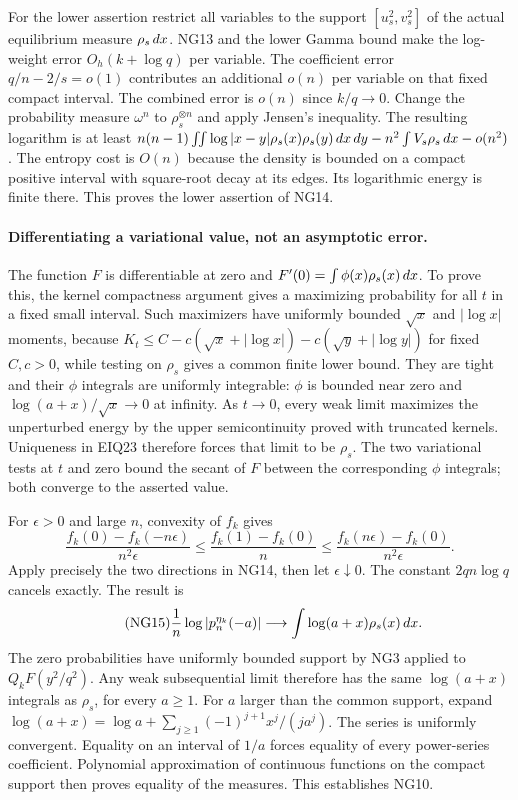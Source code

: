 For the lower assertion restrict all variables to the support
$[u_s^2,v_s^2]$ of the actual equilibrium measure $\rho_s\,d x$.
NG13 and the lower Gamma bound make the log-weight error $O_h(k+\log q)$
per variable. The coefficient error $q/n-2/s=o(1)$ contributes an
additional $o(n)$ per variable on that fixed compact interval. The
combined error is $o(n)$ since $k/q\to0$.
Change the probability measure $\omega^n$ to $\rho_s^{\otimes n}$
and apply Jensen's inequality. The resulting logarithm is at least
$n(n-1)\iint\log|x-y|\rho_s(x)\rho_s(y)\,d x\,d y
-n^2\int V_s\rho_s\,d x-o(n^2)$.
The entropy cost is $O(n)$ because the density is bounded on a compact
positive interval with square-root decay at its edges. Its logarithmic
energy is finite there. This proves the lower assertion of NG14.

\paragraph{Differentiating a variational value, not an asymptotic error.}
The function $F$ is differentiable at zero and
$F'(0)=\int\phi(x)\rho_s(x)\,d x$.
To prove this, the kernel compactness argument gives a maximizing
probability for all $t$ in a fixed small interval. Such maximizers have
uniformly bounded $\sqrt x$ and $|\log x|$ moments, because
$K_t\le C-c(\sqrt x+|\log x|)-c(\sqrt y+|\log y|)$ for fixed
$C,c>0$, while testing on $\rho_s$ gives a common finite lower bound.
They are tight and their $\phi$ integrals are uniformly integrable:
$\phi$ is bounded near zero and $\log(a+x)/\sqrt x\to0$ at infinity.
As $t\to0$, every weak limit maximizes the unperturbed energy by the
upper semicontinuity proved with truncated kernels. Uniqueness in EIQ23
therefore forces that limit to be $\rho_s$. The two variational tests
at $t$ and zero bound the secant of $F$ between the corresponding
$\phi$ integrals; both converge to the asserted value.

For $\epsilon>0$ and large $n$, convexity of $f_k$ gives
\[
 \frac{f_k(0)-f_k(-n\epsilon)}{n^2\epsilon}
 \le\frac{f_k(1)-f_k(0)}n
 \le\frac{f_k(n\epsilon)-f_k(0)}{n^2\epsilon}.
\]
Apply precisely the two directions in NG14, then let $\epsilon\downarrow0$.
The constant $2qn\log q$ cancels exactly. The result is
\begin{equation}\tag{NG15}
 \frac1n\log|p_n^{\eta_k}(-a)|\longrightarrow
                     \int\log(a+x)\rho_s(x)\,d x.
\end{equation}
The zero probabilities have uniformly bounded support by NG3 applied
to $Q_kF(y^2/q^2)$. Any weak subsequential limit therefore has the
same $\log(a+x)$ integrals as $\rho_s$, for every $a\ge1$.
For $a$ larger than the common support, expand
$\log(a+x)=\log a+\sum_{j\ge1}(-1)^{j+1}x^j/(ja^j)$.
The series is uniformly convergent. Equality on an interval of $1/a$
forces equality of every power-series coefficient. Polynomial
approximation of continuous functions on the compact support then
proves equality of the measures. This establishes NG10.

